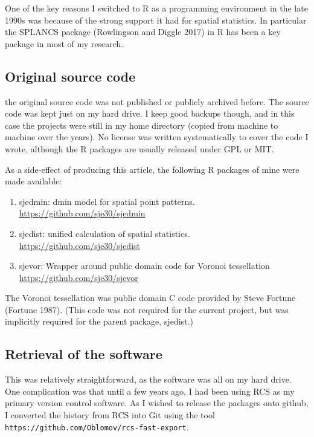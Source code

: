 \documentclass[
]{article}
\providecommand{\tightlist}{%
  \setlength{\itemsep}{0pt}\setlength{\parskip}{0pt}}
\begin{document}
One of the key reasons I switched to R as a programming environment in
the late 1990s was because of the strong support it had for spatial
statistics. In particular the SPLANCS package (Rowlingson and Diggle
2017) in R has been a key package in most of my research.

\hypertarget{original-source-code}{%
\subsection{Original source code}\label{original-source-code}}

the original source code was not published or publicly archived before.
The source code was kept just on my hard drive. I keep good backups
though, and in this case the projects were still in my home directory
(copied from machine to machine over the years). No license was written
systematically to cover the code I wrote, although the R packages are
usually released under GPL or MIT.

As a side-effect of producing this article, the following R packages of
mine were made available:

\begin{enumerate}
\def\labelenumi{\arabic{enumi}.}
\tightlist
\item
  sjedmin: dmin model for spatial point patterns.
  \url{https://github.com/sje30/sjedmin}
\item
  sjedist: unified calculation of spatial statistics.
  \url{https://github.com/sje30/sjedist}
\item
  sjevor: Wrapper around public domain code for Voronoi tessellation
  \url{https://github.com/sje30/sjevor}
\end{enumerate}

The Voronoi tessellation was public domain C code provided by Steve
Fortune (Fortune 1987). (This code was not required for the current
project, but was implicitly required for the parent package, sjedist.)

\hypertarget{retrieval-of-the-software}{%
\subsection{Retrieval of the software}\label{retrieval-of-the-software}}

This was relatively straightforward, as the software was all on my hard
drive. One complication was that until a few years ago, I had been using
RCS as my primary version control software. As I wished to release the
packages onto github, I converted the history from RCS into Git using
the tool \texttt{https://github.com/Oblomov/rcs-fast-export}.
\end{document}
